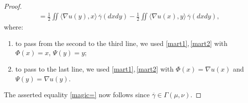 \documentclass[10pt,a4paper]{amsart}
\newcommand{\ov}{\overline}
\begin{document}
\begin{proof}
\begin{align*}
    	& =  \frac{1}{2 } \iint \big\langle \nabla u(y),x \big\rangle  \, \ov\gamma(dxdy)  - \frac{1}{2 } \iint \big\langle \nabla u(x), y \big\rangle  \, \ov\gamma(dxdy) ,
    \end{align*}
    where:
    \begin{enumerate}
    \item[-] to pass from the second to the third line, we used
     \eqref{mart1},\,\eqref{mart2}  with $\Phi(x) = x$, $\Psi(y) = y$;
     \item[-] to pass to the last line, we used \eqref{mart1},\,\eqref{mart2}  with $\Phi(x) = \nabla u(x)$ and $\Psi(y) = \nabla u(y)$.
       \end{enumerate} 
    The asserted equality \eqref{magic=} now follows since $\ov\gamma \in \Gamma(\mu,\nu)$.
\end{proof}
\end{document}
